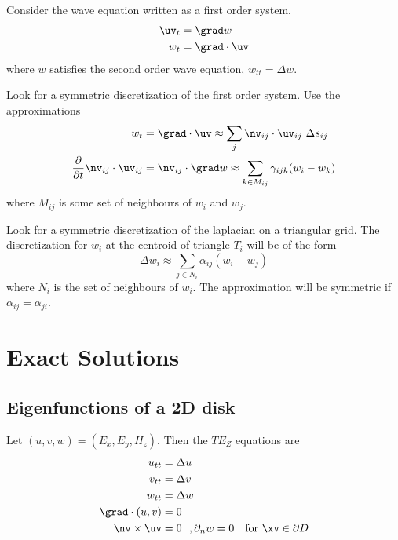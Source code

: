 \documentclass[10pt]{article}
\begin{document}
Consider the wave equation written as a first order system,
\begin{align*}
  \uv_t &= \grad w \\
  w_t &= \grad\cdot \uv
\end{align*}
where $w$ satisfies the second order wave equation, $w_{tt} = \Delta w$.

Look for a symmetric discretization of the first order system.
Use the approximations
\begin{align*}
   w_t &= \grad\cdot\uv  \approx  \sum_j \nv_{ij}\cdot\uv_{ij} ~\Delta s_{ij} \\
   {\partial\over\partial t} \nv_{ij}\cdot\uv_{ij} &= \nv_{ij}\cdot\grad w \approx \sum_{k\in M_{ij}} \gamma_{ijk} (w_i - w_k)
\end{align*}
where $M_{ij}$ is some set of neighbours of $w_i$ and $w_j$.

Look for a symmetric discretization of the laplacian on a triangular grid.
The discretization for $w_i$ at the centroid of triangle $T_i$ will be of the form
\[
    \Delta w_i \approx \sum_{j\in N_i} \alpha_{ij} (w_i - w_j)
\]
where $N_i$ is the set of neighbours of $w_i$.
The approximation will be symmetric if $\alpha_{ij} = \alpha_{ji}$.



\clearpage
\section{Exact Solutions}

\subsection{Eigenfunctions of a 2D disk}\label{sec:diskEigenfunctions}


Let $(u,v,w)=(E_x,E_y,H_z)$. Then the $TE_Z$ equations are 
\begin{align*}
  u_{tt} & = \Delta u \\
  v_{tt} & = \Delta v \\
  w_{tt} & = \Delta w \\
  \grad\cdot (u,v) &= 0 \\
  \nv\times\uv&=0 ~~, \partial_n w =0 \quad\mbox{for $\xv\in\partial D$}
\end{align*}
\end{document}

